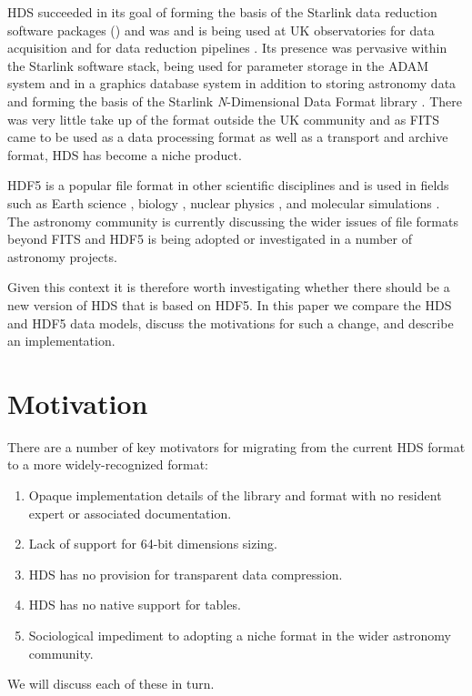 \documentclass[final,authoryear,5p,times,twocolumn]{elsarticle}
\begin{document}
HDS succeeded in its goal of forming the basis of the Starlink data
reduction software packages () and was and is being
used at UK observatories for data acquisition and for data reduction
pipelines \citep{2011tfa..confE..42J,2015A&C.....9...40J}. Its presence was
pervasive within the Starlink software stack, being used for parameter
storage in the ADAM system \citep{1992ASPC...25..126A} and in a
graphics database system \citep{SUN48} in addition to storing
astronomy data and forming the basis of the Starlink
\emph{N}-Dimensional Data Format library \citep[NDF;][]{2015Jenness}. There was
very little take up of the format outside the UK community \citep[but
see e.g.,][]{1993STARB..12...10M} and as FITS came to be used as a data
processing format as well as a transport and archive format, HDS has become a niche product.

HDF5 is a popular file format in other scientific disciplines and is
used in fields such as Earth science \citep[e.g.,][]{2005Yang}, biology
\citep[e.g.,][]{Dougherty:2009:UBI:1562764.1562781}, nuclear physics
\citep[e.g.,][]{1742-6596-425-6-062008}, and molecular simulations
\citep[e.g.,][]{deBuyl20141546}. The astronomy community is currently
discussing the wider issues of file formats beyond FITS
\citep{B1_adassxxiv,2015Thomas} and HDF5 is being adopted
\citep[e.g.,][]{2012ASPC..461..283A} or investigated
\citep[e.g.,][]{P3-1_adassxxiv,O4-4_adassxxiv} in a number of astronomy
projects.

Given this context it is therefore worth investigating whether there
should be a new version of HDS that is based on HDF5. In this paper we
compare the HDS and HDF5 data models, discuss the motivations for such
a change, and describe an implementation.

\section{Motivation}

There are a number of key motivators for migrating from the current HDS
format to a more widely-recognized format:
\begin{enumerate}
\item Opaque implementation details of the library and format with no
  resident expert or associated documentation.
\item Lack of support for 64-bit dimensions sizing.
\item HDS has no provision for transparent data compression.
\item HDS has no native support for tables.
\item Sociological impediment to adopting a niche format in the wider
  astronomy community.
\end{enumerate}
We will discuss each of these in turn.
\end{document}
